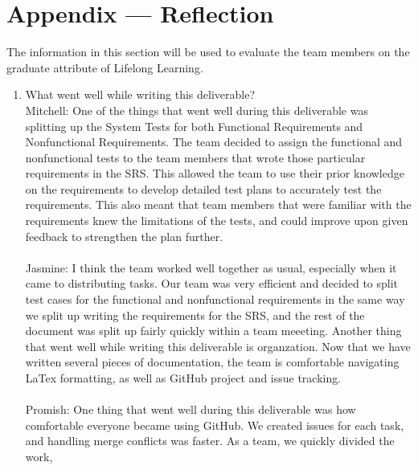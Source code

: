 \documentclass[12pt, titlepage]{article}
\begin{document}
\newpage{}
\section*{Appendix --- Reflection}


The information in this section will be used to evaluate the team members on the
graduate attribute of Lifelong Learning.



\begin{enumerate}
  \item What went well while writing this deliverable?\\
  \newline
  \hspace{2em} Mitchell: One of the things that went well during this deliverable was splitting up
  the System Tests for both Functional Requirements and Nonfunctional Requirements. The team decided
  to assign the functional and nonfunctional tests to the team members that wrote those particular
  requirements in the SRS. This allowed the team to use their prior knowledge on the requirements
  to develop detailed test plans to accurately test the requirements. This also meant that team members
  that were familiar with the requirements knew the limitations of the tests, and could improve upon
  given feedback to strengthen the plan further.\\\\
  \hspace{2em} Jasmine: I think the team worked well together as usual, especially when it came to 
  distributing tasks. Our team was very efficient and decided to split test cases for the functional and 
  nonfunctional requirements in the same way we split up writing the requirements for the SRS, and the 
  rest of the document was split up fairly quickly within a team meeeting. Another thing that went well 
  while writing this deliverable is organzation. Now that we have written several pieces of documentation, 
  the team is comfortable navigating LaTex formatting, as well as GitHub project and issue tracking.\\\\
  \hspace{2em} Promish: One thing that went well during this deliverable was how 
  comfortable everyone became using GitHub. We created issues for each task, and 
  handling merge conflicts was faster. As a team, we quickly divided the work, 

\end{enumerate}
\end{document}
